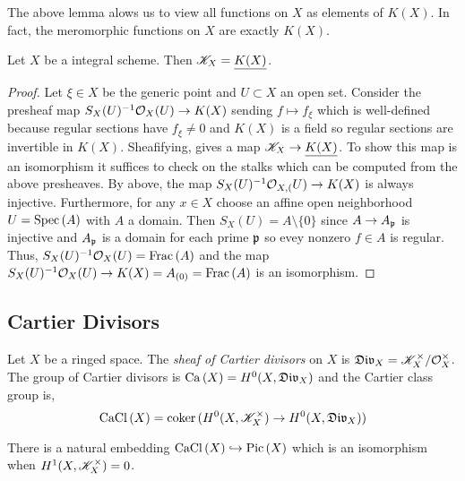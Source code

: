 \documentclass[12pt]{article}
\begin{document}
\begin{rmk}
The above lemma alows us to view all functions on $X$ as elements of $K(X)$. In fact, the meromorphic functions on $X$ are exactly $K(X)$. 
\end{rmk}

\begin{prop}
Let $X$ be a integral scheme. Then $\mathscr{K}_X = \underline{K(X)}$.
\end{prop}

\begin{proof}
Let $\xi \in X$ be the generic point and $U \subset X$ an open set. Consider the  presheaf map $S_X(U)^{-1} \mathcal{O}_{X}(U) \to K(X)$ sending $f \mapsto f_\xi$ which is well-defined because regular sections have $f_\xi \neq 0$ and $K(X)$ is a field so regular sections are invertible in $K(X)$. Sheafifying, gives a map $\mathscr{K}_X \to \underline{K(X)}$. To show this map is an isomorphism it suffices to check on the stalks which can be computed from the above presheaves. By above, the map $S_X(U)^{-1} \mathcal{O}_{X, (}U) \to K(X)$ is always injective. Furthermore, for any $x \in X$ choose an affine open neighborhood $U = \mathrm{Spec}\left( A \right)$ with $A$ a domain. Then $S_X(U) = A \setminus \{ 0 \}$ since $A \to A_{\mathfrak{p}}$ is injective and $A_{\mathfrak{p}}$ is a domain for each prime $\mathfrak{p}$ so evey nonzero $f \in A$ is regular. Thus, $S_X(U)^{-1} \mathcal{O}_{X}(U) = \mathrm{Frac}\left(A\right)$ and the map $S_X(U)^{-1} \mathcal{O}_{X}(U) \to K(X) = A_{(0)} = \mathrm{Frac}\left(A\right)$ is an isomorphism.   
\end{proof}

\subsection{Cartier Divisors}

\begin{defn}
Let $X$ be a ringed space. The \textit{sheaf of Cartier divisors} on $X$ is $\mathfrak{Div}_X = \mathscr{K}_X^\times / \mathcal{O}_{X}^\times$. The group of Cartier divisors is $\mathrm{Ca}\left( X \right) = H^0(X, \mathfrak{Div}_X)$ and the Cartier class group is,
\[ \mathrm{CaCl}\left( X \right) = \operatorname{\mathrm{coker}}{(H^0(X, \mathscr{K}_X^\times) \to H^0(X, \mathfrak{Div}_X))} \]
\end{defn}

\begin{prop}
There is a natural embedding $\mathrm{CaCl}\left( X \right) \hookrightarrow \mathrm{Pic} \left( X \right)$ which is an isomorphism when $H^1(X, \mathscr{K}_X^\times) = 0$.
\end{prop}
\end{document}

